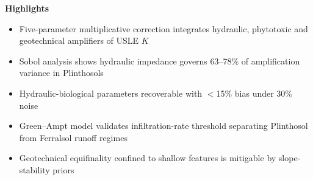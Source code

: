 \documentclass[12pt]{article}
\begin{document}
\begin{center}
{\Large\bfseries Highlights}
\end{center}

\begin{itemize}
\item Five-parameter multiplicative correction integrates hydraulic, phytotoxic and geotechnical amplifiers of USLE $K$
\item Sobol analysis shows hydraulic impedance governs 63--78\% of amplification variance in Plinthosols
\item Hydraulic-biological parameters recoverable with $<$15\% bias under 30\% noise
\item Green--Ampt model validates infiltration-rate threshold separating Plinthosol from Ferralsol runoff regimes
\item Geotechnical equifinality confined to shallow features is mitigable by slope-stability priors
\end{itemize}
\end{document}
